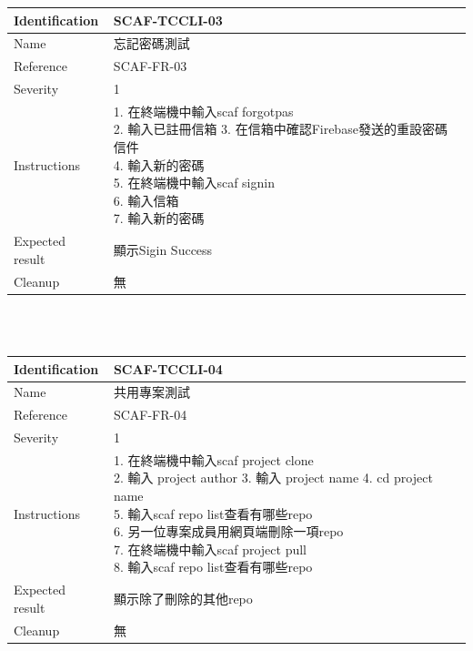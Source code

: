 \documentclass{report}
\begin{document}
\begin{tabularx}{\textwidth}{
  |p{}%
  |p{}|%
  }
  \hline
  \centering Identification &  SCAF-TCCLI-03 \\
  \hline
  \centering Name & 忘記密碼測試 \\
  \hline
  \centering Reference & SCAF-FR-03 \\
  \hline
  \centering Severity & 1 \\
  \hline
  \centering Instructions & 
  \makecell[l]{
    1. 在終端機中輸入scaf forgotpas\\
    2. 輸入已註冊信箱
    3. 在信箱中確認Firebase發送的重設密碼信件 \\
    4. 輸入新的密碼 \\
    5. 在終端機中輸入scaf signin\\
    6. 輸入信箱 \\
    7. 輸入新的密碼 \\
  }\\
  \hline
  \centering Expected result & 顯示Sigin Success \\
  \hline
  \centering Cleanup & 無 \\
  \hline
\end{tabularx}
\\
\newline
\\

\begin{tabularx}{\textwidth}{
  |p{}%
  |p{}|%
  }
  \hline
  \centering Identification &  SCAF-TCCLI-04 \\
  \hline
  \centering Name & 共用專案測試 \\
  \hline
  \centering Reference & SCAF-FR-04 \\
  \hline
  \centering Severity & 1 \\
  \hline
  \centering Instructions & 
  \makecell[l]{
    1. 在終端機中輸入scaf project clone \\
    2. 輸入 project author
    3. 輸入 project name
    4. cd project name\\
    5. 輸入scaf repo list查看有哪些repo \\
    6. 另一位專案成員用網頁端刪除一項repo \\
    7. 在終端機中輸入scaf project pull \\ 
    8. 輸入scaf repo list查看有哪些repo \\
  }\\
  \hline
  \centering Expected result & 顯示除了刪除的其他repo \\
  \hline
  \centering Cleanup & 無 \\
  \hline
\end{tabularx}
\\
\newline
\\
\end{document}
